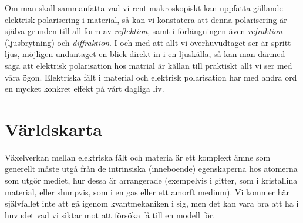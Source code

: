 {{{{Om man skall sammanfatta vad vi rent makroskopiskt kan uppfatta g{\"a}llande
elektrisk polarisering i material, s{\aa} kan vi konstatera att denna
polarisering {\"a}r sj{\"a}lva grunden till all form av {\it reflektion},
samt i f{\"o}rl{\"a}ngningen {\"a}ven {\it refraktion} (ljusbrytning) och
{\it diffraktion}.
I och med att allt vi {\"o}verhuvudtaget ser {\"a}r spritt ljus, m{\"o}jligen
undantaget en blick direkt in i en ljusk{\"a}lla, s{\aa} kan man d{\"a}rmed
s{\"a}ga att elektrisk polarisation hos matrial {\"a}r k{\"a}llan till praktiskt
allt vi ser med v{\aa}ra {\"o}gon. Elektriska f{\"a}lt i material och elektrisk
polarisation har med andra ord en mycket konkret effekt p{\aa} v{\aa}rt dagliga
liv.

\section{V{\"a}rldskarta}
V{\"a}xelverkan mellan elektriska f{\"a}lt och materia {\"a}r ett komplext
{\"a}mne som generellt m{\aa}ste utg{\aa} fr{\aa}n de intrinsiska (inneboende)
egenskaperna hos atomerna som utg{\"o}r mediet, hur dessa {\"a}r arrangerade
(exempelvis i gitter, som i kristallina material, eller slumpvis, som i en gas
eller ett amorft medium).
Vi kommer h{\"a}r sj{\"a}lvfallet inte att g{\aa} igenom kvantmekaniken i sig,
men det kan vara bra att ha i huvudet vad vi siktar mot att f{\"o}rs{\"o}ka
f{\aa} till en modell f{\"o}r.

}}}}

